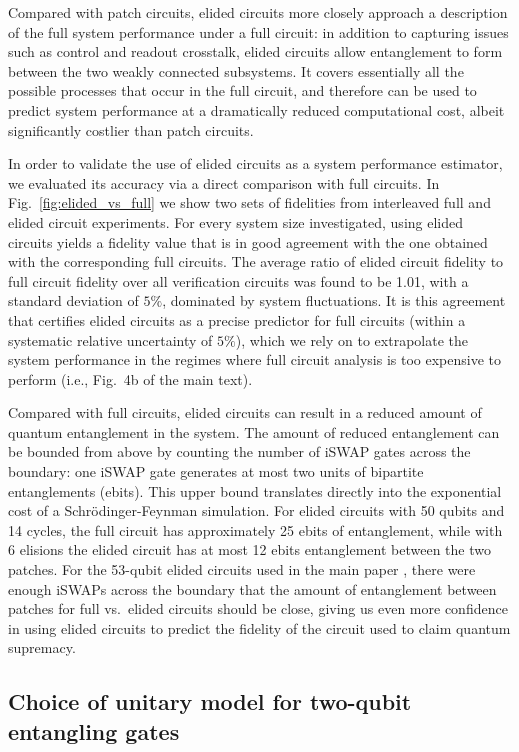 Compared with patch circuits, elided circuits more closely approach a description of the full system performance under a full circuit: in addition to capturing issues such as control and readout crosstalk, elided circuits allow entanglement to form between the two weakly connected subsystems. It covers essentially all the possible processes that occur in the full  circuit, and therefore can be used to predict system performance at a dramatically reduced computational cost, albeit significantly costlier than patch circuits.

In order to validate the use of elided circuits as a system performance estimator, we evaluated its accuracy via a direct comparison with full circuits.  In Fig.~\ref{fig:elided_vs_full} we show two sets of fidelities from interleaved full and elided circuit experiments. For every system size investigated, using elided circuits yields a fidelity value that is in good agreement with the one obtained with the corresponding full circuits. The average ratio of elided circuit fidelity to full circuit fidelity over all verification circuits was found to be 1.01, with a standard deviation of $5\%$, dominated by system fluctuations. It is this agreement that certifies elided circuits as a precise predictor for full circuits (within a systematic relative uncertainty of $5\%$), which we rely on to extrapolate the system performance in the regimes where full circuit analysis is too expensive to perform (i.e., Fig.~4b of the main text).

Compared with full circuits, elided circuits can result in a reduced amount of quantum entanglement in the system. The amount of reduced entanglement can be bounded from above by counting the number of iSWAP gates across the boundary: one iSWAP gate generates at most two units of bipartite entanglements (ebits). This upper bound translates directly into the exponential cost of a Schr\"odinger-Feynman simulation. For elided circuits with 50 qubits and 14 cycles, the full circuit has approximately 25 ebits of entanglement, while with 6 elisions the elided circuit has at most 12 ebits entanglement between the two patches. For the 53-qubit elided circuits used in the main paper \cite{arute2019}, there were enough iSWAPs across the boundary that the amount of entanglement between patches for full vs.~elided circuits should be close, giving us even more confidence in using elided circuits to predict the fidelity of the circuit used to claim quantum supremacy.

\subsection{Choice of unitary model for two-qubit entangling gates}

